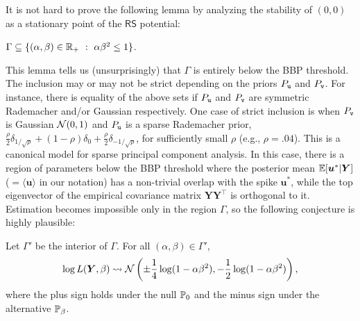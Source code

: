 \documentclass[final,12pt]{colt2018} %
\renewcommand{\intercal}{{\bm \top}}
\newcommand{\RS}{\mathsf{RS}} %
\newcommand{\utt}{\textup{\texttt{u}}}
\newcommand{\vtt}{\textup{\texttt{v}}}
\renewcommand{\u}{\bm{u}}
\newcommand{\Y}{\bm{Y}}
\begin{document}
It is not hard to prove the following lemma by analyzing the stability of $(0,0)$ as a stationary point of the $\RS$ potential:   
\begin{lemma}
$\Gamma \subseteq \{(\alpha,\beta) \in \Rp~:~\alpha \beta^2 \le 1\}$.
\end{lemma}
This lemma tells us (unsurprisingly) that $\Gamma$ is entirely below the BBP threshold. The inclusion may or may not be strict depending on the priors $P_{\utt}$ and $P_{\vtt}$. For instance, there is equality of the above sets if $P_{\utt}$ and $P_{\vtt}$ are symmetric Rademacher and/or Gaussian respectively.     
One case of strict inclusion is when $P_{\vtt}$ is Gaussian $\normal(0,1)$ and $P_{\utt}$ is a sparse Rademacher prior, $\frac{\rho}{2}\delta_{1/\sqrt{\rho}}+ (1-\rho)\delta_{0} + \frac{\rho}{2}\delta_{-1/\sqrt{\rho}}$, for sufficiently small $\rho$ (e.g., $\rho = .04$). This is a canonical model for sparse principal component analysis. In this case, there is a region of parameters below the BBP threshold where the posterior mean $\E[\u^*|\Y]$ ($= \langle \u\rangle$ in our notation) has a non-trivial overlap with the spike $\u^*$, while the top eigenvector of the empirical covariance matrix $\Y\Y^\intercal$ is orthogonal to it. Estimation becomes impossible only in the region $\Gamma$, so the following conjecture is highly plausible: 
   
 
\begin{conjecture}
Let $\Gamma'$ be the interior of $\Gamma$. For all $(\alpha,\beta) \in \Gamma'$, 
\[\log L(\Y,\beta) \rightsquigarrow \normal\left(\pm \frac{1}{4}\log(1-\alpha\beta^2),-\frac{1}{2}\log(1-\alpha\beta^2)\right),\]
where the plus sign holds under the null $\P_{0}$ and the minus sign under the alternative $\P_{\beta}$.
\end{conjecture}
 
\end{document}
